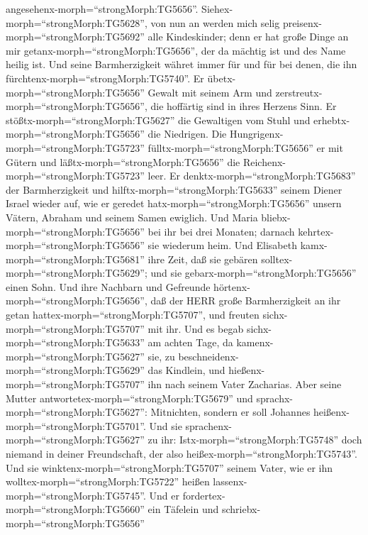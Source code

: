 angesehenx-morph=``strongMorph:TG5656''.
Siehex-morph=``strongMorph:TG5628'', von nun an werden mich selig
preisenx-morph=``strongMorph:TG5692'' alle Kindeskinder; 
denn er hat große Dinge an mir getanx-morph=``strongMorph:TG5656'', der
da mächtig ist und des Name heilig ist.  Und seine
Barmherzigkeit währet immer für und für bei denen, die ihn
fürchtenx-morph=``strongMorph:TG5740''.  Er
übetx-morph=``strongMorph:TG5656'' Gewalt mit seinem Arm und
zerstreutx-morph=``strongMorph:TG5656'', die hoffärtig sind in ihres
Herzens Sinn.  Er stößtx-morph=``strongMorph:TG5627'' die
Gewaltigen vom Stuhl und erhebtx-morph=``strongMorph:TG5656'' die
Niedrigen.  Die Hungrigenx-morph=``strongMorph:TG5723''
fülltx-morph=``strongMorph:TG5656'' er mit Gütern und
läßtx-morph=``strongMorph:TG5656'' die
Reichenx-morph=``strongMorph:TG5723'' leer.  Er
denktx-morph=``strongMorph:TG5683'' der Barmherzigkeit und
hilftx-morph=``strongMorph:TG5633'' seinem Diener Israel wieder auf,
 wie er geredet hatx-morph=``strongMorph:TG5656'' unsern
Vätern, Abraham und seinem Samen ewiglich.  Und Maria
bliebx-morph=``strongMorph:TG5656'' bei ihr bei drei Monaten; darnach
kehrtex-morph=``strongMorph:TG5656'' sie wiederum heim. 
Und Elisabeth kamx-morph=``strongMorph:TG5681'' ihre Zeit, daß sie
gebären solltex-morph=``strongMorph:TG5629''; und sie
gebarx-morph=``strongMorph:TG5656'' einen Sohn.  Und ihre
Nachbarn und Gefreunde hörtenx-morph=``strongMorph:TG5656'', daß der
HERR große Barmherzigkeit an ihr getan
hattex-morph=``strongMorph:TG5707'', und freuten
sichx-morph=``strongMorph:TG5707'' mit ihr.  Und es begab
sichx-morph=``strongMorph:TG5633'' am achten Tage, da
kamenx-morph=``strongMorph:TG5627'' sie, zu
beschneidenx-morph=``strongMorph:TG5629'' das Kindlein, und
hießenx-morph=``strongMorph:TG5707'' ihn nach seinem Vater Zacharias.
 Aber seine Mutter antwortetex-morph=``strongMorph:TG5679''
und sprachx-morph=``strongMorph:TG5627'': Mitnichten, sondern er soll
Johannes heißenx-morph=``strongMorph:TG5701''.  Und sie
sprachenx-morph=``strongMorph:TG5627'' zu ihr:
Istx-morph=``strongMorph:TG5748'' doch niemand in deiner Freundschaft,
der also heißex-morph=``strongMorph:TG5743''.  Und sie
winktenx-morph=``strongMorph:TG5707'' seinem Vater, wie er ihn
wolltex-morph=``strongMorph:TG5722'' heißen
lassenx-morph=``strongMorph:TG5745''.  Und er
fordertex-morph=``strongMorph:TG5660'' ein Täfelein und
schriebx-morph=``strongMorph:TG5656''
